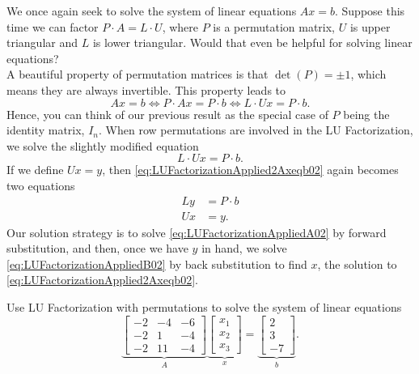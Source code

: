 \begin{tcolorbox}[title=\textbf{\large Solving $\mathbf{Ax=b}$ \textcolor{red}{\bf via LU} with \textcolor{red}{\bf Row Permutations}}]
We once again seek to solve the system of linear equations $Ax=b$. Suppose this time we can factor $P \cdot A=L \cdot U$, where $P$ is a permutation matrix, $U$ is upper triangular and $L$ is lower triangular. Would that even be helpful for solving linear equations? \\

 A beautiful property of permutation matrices is that $\det(P)=\pm 1$, which means they are always invertible. This property leads to
 $$Ax = b \iff P \cdot A x = P \cdot b \iff L \cdot U x = P \cdot b. $$
 Hence, you can think of our previous result as the special case of $P$ being the identity matrix, $I_n$. When row permutations are involved in the LU Factorization, we solve the slightly modified equation
\begin{equation}
\label{eq:LUFactorizationApplied2Axeqb02}
  L \cdot U x = P \cdot b.  
\end{equation} 
If we define $Ux=y$, then \eqref{eq:LUFactorizationApplied2Axeqb02} again becomes two equations
\begin{align}
  \label{eq:LUFactorizationAppliedA02}
  L y &= P\cdot b \\
    \label{eq:LUFactorizationAppliedB02}
 U x &=y.
\end{align}
Our solution strategy is to solve \eqref{eq:LUFactorizationAppliedA02} by forward substitution, and then, once we have $y$ in hand, we solve \eqref{eq:LUFactorizationAppliedB02}
by back substitution to find $x$, the solution to \eqref{eq:LUFactorizationApplied2Axeqb02}.
\end{tcolorbox}

\begin{example}
\label{ex:SolveUsingLu01WithPerm} 
Use LU Factorization with permutations to solve the system of linear equations
\begin{equation}
    \label{eq:Chap5pt4AwithPerm}
\underbrace{\left[\begin{array}{rrr} -2 & -4 & -6\\
-2 & 1 & -4 \\ -2 & 11 & -4 \end{array}\right]}_{A}  \underbrace{\left[\begin{array}{r} x_1\\
x_2 \\ x_3\end{array}\right]}_{x} 
= \underbrace{\left[\begin{array}{r} 2\\
3 \\ -7 \end{array}\right]}_{b}. 
\end{equation}
\end{example}

